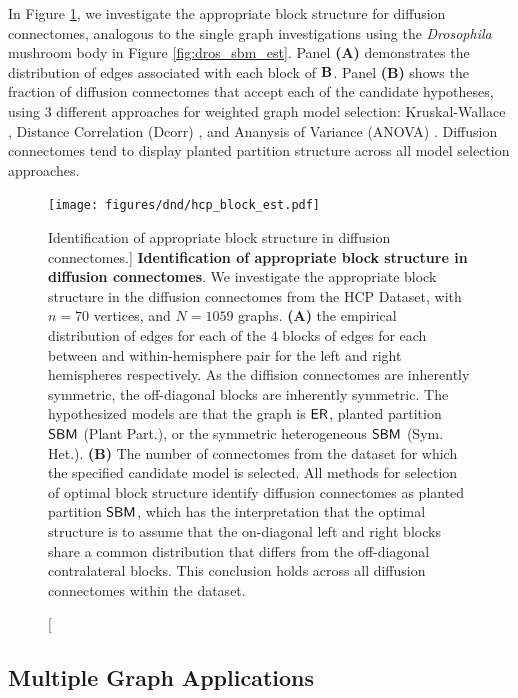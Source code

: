 In Figure \ref{fig:nested_sbm_ts_mri}, we investigate the appropriate block structure for diffusion connectomes, analogous to the single graph investigations using the \textit{Drosophila} mushroom body in Figure \ref{fig:dros_sbm_est}. Panel \textbf{(A)} demonstrates the distribution of edges associated with each block of $\operatorname{\mathbf{B}}$. Panel \textbf{(B)} shows the fraction of diffusion connectomes that accept each of the candidate hypotheses, using $3$ different approaches for weighted graph model selection: Kruskal-Wallace  \cite{Kruskal1952-kj}, Distance Correlation (Dcorr) \cite{Szekely2007-mm}, and Ananysis of Variance (ANOVA) \cite{Fisher1925-xm,Scheffe1999-pi}. Diffusion connectomes tend to display planted partition structure across all model selection approaches.

\begin{figure}
    \centering
    \texttt{[image: figures/dnd/hcp\_block\_est.pdf]}
    \caption
    [Identification of appropriate block structure in diffusion connectomes.]
    {\textbf{Identification of appropriate block structure in diffusion connectomes}. We investigate the appropriate block structure in the diffusion connectomes from the HCP Dataset, with $n=70$ vertices, and $N=1059$ graphs. \textbf{(A)} the empirical distribution of edges for each of the $4$ blocks of edges for each between and within-hemisphere pair for the left and right hemispheres respectively. As the diffision connectomes are inherently symmetric, the off-diagonal blocks are inherently symmetric. The hypothesized models are that the graph is $\operatorname{\mathsf{ER}}$, planted partition $\operatorname{\mathsf{SBM}}$ (Plant Part.), or the symmetric heterogeneous $\operatorname{\mathsf{SBM}}$ (Sym. Het.). \textbf{(B)} The number of connectomes from the dataset for which the specified candidate model is selected. All methods for selection of optimal block structure identify diffusion connectomes as planted partition $\operatorname{\mathsf{SBM}}$, which has the interpretation that the optimal structure is to assume that the on-diagonal left and right blocks share a common distribution that differs from the off-diagonal contralateral blocks. This conclusion holds across all diffusion connectomes within the dataset.}
    \label{fig:nested_sbm_ts_mri}
\end{figure}

\subsection{Multiple Graph Applications}\label{sec:multi_app_appendix}

